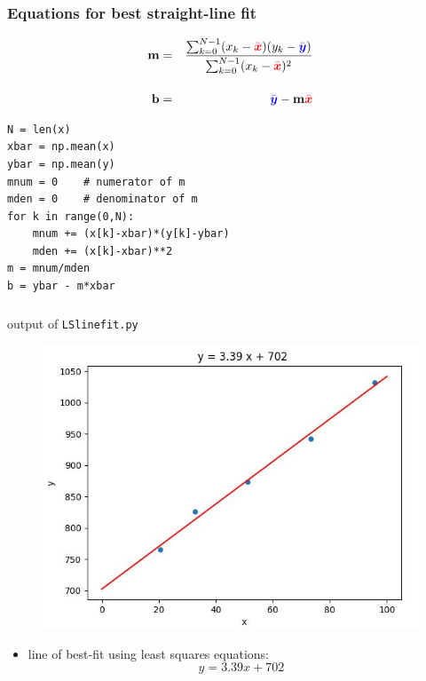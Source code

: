 \documentclass[english,14pt]{beamer}
\newcommand\red[1]{{\color{red} #1}}
\newcommand\blue[1]{{\color{blue} #1}}
\begin{document}

\begin{frame}[fragile]

\frametitle{Equations for best straight-line fit}
\vspace*{-6mm}
\begin{eqnarray*}
\mathbf{m} & = & \frac{\sum_{k=0}^{N-1}(x_k-\red{\bar{\boldsymbol{x}}})(y_k-\blue{\bar{\boldsymbol{y}}})}{\sum_{k=0}^{N-1} (x_k-\red{\bar{\boldsymbol{x}}})^2} \\[4mm]
\mathbf{b} & = & \blue{\bar{\boldsymbol{y}}} - \mathbf{m} \red{\bar{\boldsymbol{x}}}
\end{eqnarray*}
\vspace*{-7mm}
\begin{lstlisting}[style=CStyle,basicstyle=\footnotesize]
N = len(x)
xbar = np.mean(x)
ybar = np.mean(y)
mnum = 0    # numerator of m
mden = 0    # denominator of m
for k in range(0,N):
    mnum += (x[k]-xbar)*(y[k]-ybar)
    mden += (x[k]-xbar)**2
m = mnum/mden
b = ybar - m*xbar
\end{lstlisting}

\end{frame}


\begin{frame}[fragile]

\frametitle{}

output of \texttt{LSlinefit.py}
\vspace*{-3mm}
\begin{figure}[ht]
	\centering
	\includegraphics[width=.74\textwidth]{figures/LSlinefitOutput}
\end{figure}
\vspace*{-5mm}
\begin{itemize}
	\item line of best-fit using least squares equations:
	\[
		y = 3.39x + 702
	\]
\end{itemize}

\end{frame}
\end{document}
